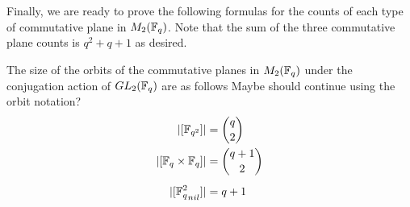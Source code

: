 \documentclass{amsart}
\begin{document}
Finally, we are ready to prove the following formulas for the counts of each type of commutative plane in $M_2(\protect\mathbb{F}_q)$. Note that the sum of the three commutative plane counts is $q^2 + q + 1$ as desired.

\begin{theorem}\label{plane-counts}
    The size of the orbits of the commutative planes in $M_2(\protect\mathbb{F}_q)$ under the conjugation action of $GL_2(\protect\mathbb{F}_q)$ are as follows {\color{blue} Maybe should continue using the orbit notation?}
    \begin{align}
        |[\protect\mathbb{F}_{q^2}]|                   &= \binom{q}{2} \\
        |[\protect\mathbb{F}_q \times \protect\mathbb{F}_q]|          &= \binom{q + 1}{2} \\[0.5em]
        |[{\protect\mathbb{F}_q^2}_{nil}]|             &= q + 1
    \end{align}
\end{theorem}
\end{document}
